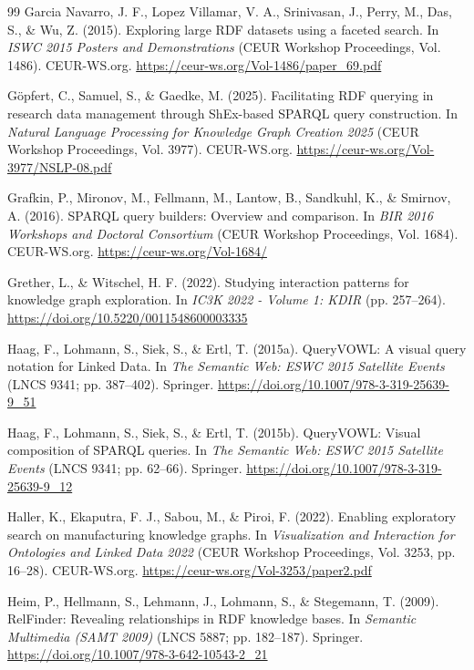 \documentclass[manuscript,review,screen]{acmart}
\begin{document}
\begin{thebibliography}{99}
 Garcia Navarro, J. F., Lopez Villamar, V. A., Srinivasan, J., Perry, M., Das, S., \& Wu, Z. (2015). Exploring large RDF datasets using a faceted search. In \textit{ISWC 2015 Posters and Demonstrations} (CEUR Workshop Proceedings, Vol. 1486). CEUR-WS.org. \url{https://ceur-ws.org/Vol-1486/paper_69.pdf}

 G\"{o}pfert, C., Samuel, S., \& Gaedke, M. (2025). Facilitating RDF querying in research data management through ShEx-based SPARQL query construction. In \textit{Natural Language Processing for Knowledge Graph Creation 2025} (CEUR Workshop Proceedings, Vol. 3977). CEUR-WS.org. \url{https://ceur-ws.org/Vol-3977/NSLP-08.pdf}

 Grafkin, P., Mironov, M., Fellmann, M., Lantow, B., Sandkuhl, K., \& Smirnov, A. (2016). SPARQL query builders: Overview and comparison. In \textit{BIR 2016 Workshops and Doctoral Consortium} (CEUR Workshop Proceedings, Vol. 1684). CEUR-WS.org. \url{https://ceur-ws.org/Vol-1684/}

 Grether, L., \& Witschel, H. F. (2022). Studying interaction patterns for knowledge graph exploration. In \textit{IC3K 2022 - Volume 1: KDIR} (pp. 257--264). \url{https://doi.org/10.5220/0011548600003335}

 Haag, F., Lohmann, S., Siek, S., \& Ertl, T. (2015a). QueryVOWL: A visual query notation for Linked Data. In \textit{The Semantic Web: ESWC 2015 Satellite Events} (LNCS 9341; pp. 387--402). Springer. \url{https://doi.org/10.1007/978-3-319-25639-9_51}

 Haag, F., Lohmann, S., Siek, S., \& Ertl, T. (2015b). QueryVOWL: Visual composition of SPARQL queries. In \textit{The Semantic Web: ESWC 2015 Satellite Events} (LNCS 9341; pp. 62--66). Springer. \url{https://doi.org/10.1007/978-3-319-25639-9_12}

 Haller, K., Ekaputra, F. J., Sabou, M., \& Piroi, F. (2022). Enabling exploratory search on manufacturing knowledge graphs. In \textit{Visualization and Interaction for Ontologies and Linked Data 2022} (CEUR Workshop Proceedings, Vol. 3253, pp. 16--28). CEUR-WS.org. \url{https://ceur-ws.org/Vol-3253/paper2.pdf}

 Heim, P., Hellmann, S., Lehmann, J., Lohmann, S., \& Stegemann, T. (2009). RelFinder: Revealing relationships in RDF knowledge bases. In \textit{Semantic Multimedia (SAMT 2009)} (LNCS 5887; pp. 182--187). Springer. \url{https://doi.org/10.1007/978-3-642-10543-2_21}


\end{thebibliography}
\end{document}
